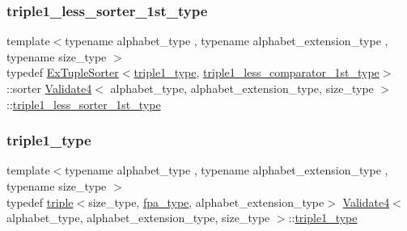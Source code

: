 \subsubsection{\texorpdfstring{triple1\+\_\+less\+\_\+sorter\+\_\+1st\+\_\+type}{triple1\_less\_sorter\_1st\_type}}
{\footnotesize\ttfamily template$<$typename alphabet\+\_\+type , typename alphabet\+\_\+extension\+\_\+type , typename size\+\_\+type $>$ \\
typedef \hyperlink{struct_ex_tuple_sorter}{Ex\+Tuple\+Sorter}$<$\hyperlink{class_validate4_a8dd208bf04e6c5285cdacb9ac9532a67}{triple1\+\_\+type}, \hyperlink{class_validate4_af07a5152d547f7fba2f93b78660b88ab}{triple1\+\_\+less\+\_\+comparator\+\_\+1st\+\_\+type}$>$\+::sorter \hyperlink{class_validate4}{Validate4}$<$ alphabet\+\_\+type, alphabet\+\_\+extension\+\_\+type, size\+\_\+type $>$\+::\hyperlink{class_validate4_aa4a137d0ed68e95db5ebbe57544d80ed}{triple1\+\_\+less\+\_\+sorter\+\_\+1st\+\_\+type}\hspace{0.3cm}{\ttfamily [private]}}

\mbox{\label{class_validate4_a8dd208bf04e6c5285cdacb9ac9532a67}} 
\subsubsection{\texorpdfstring{triple1\+\_\+type}{triple1\_type}}
{\footnotesize\ttfamily template$<$typename alphabet\+\_\+type , typename alphabet\+\_\+extension\+\_\+type , typename size\+\_\+type $>$ \\
typedef \hyperlink{structtriple}{triple}$<$size\+\_\+type, \hyperlink{common_8h_a7fdaf8b9b3d2f6ae6b10597a8d3f96ee}{fpa\+\_\+type}, alphabet\+\_\+extension\+\_\+type$>$ \hyperlink{class_validate4}{Validate4}$<$ alphabet\+\_\+type, alphabet\+\_\+extension\+\_\+type, size\+\_\+type $>$\+::\hyperlink{class_validate4_a8dd208bf04e6c5285cdacb9ac9532a67}{triple1\+\_\+type}\hspace{0.3cm}{\ttfamily [private]}}

\mbox{\label{class_validate4_a17f3f46281d706a75c002eed273aeaf8}} 
